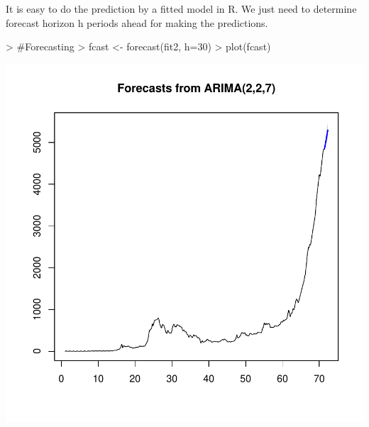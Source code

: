 \documentclass{article}
\begin{document}
It is easy to do the prediction by a fitted model in R. We just need to determine forecast horizon h periods ahead for making the predictions.
\begin{Schunk}
\begin{Sinput}
> #Forecasting
> fcast <- forecast(fit2, h=30)
> plot(fcast)
\end{Sinput}
\end{Schunk}
\includegraphics{Report-020}
\end{document}
